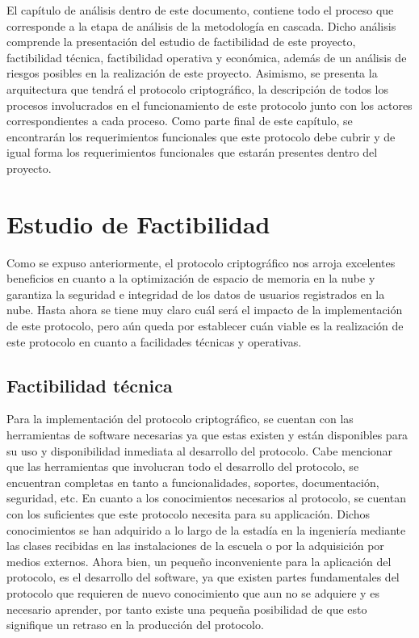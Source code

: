 
El capítulo de análisis dentro de este documento, contiene todo el proceso que corresponde a la etapa de análisis de la metodología en cascada. Dicho análisis comprende la presentación del estudio de factibilidad de este proyecto, factibilidad técnica, factibilidad operativa y económica, además de un análisis de riesgos posibles en la realización de este proyecto. Asimismo, se presenta la arquitectura que tendrá el protocolo criptográfico, la descripción de todos los procesos involucrados en el funcionamiento de este protocolo junto con los actores correspondientes a cada proceso. Como parte final de este capítulo, se encontrarán los requerimientos funcionales que este protocolo debe cubrir y de igual forma los requerimientos funcionales que estarán presentes dentro del proyecto. 






\section{Estudio de Factibilidad}

Como se expuso anteriormente, el protocolo criptográfico nos arroja excelentes beneficios en cuanto a la optimización de espacio de memoria en la nube y garantiza la seguridad e integridad de los datos de usuarios registrados en la nube. Hasta ahora se tiene muy claro cuál será el impacto de la implementación de este protocolo, pero aún queda por establecer cuán viable es la realización de este protocolo en cuanto a facilidades técnicas y operativas.


\subsection{Factibilidad técnica}

Para la implementación del protocolo criptográfico, se cuentan con las herramientas de software necesarias ya que estas existen y están disponibles para su uso y disponibilidad inmediata al desarrollo del protocolo. Cabe mencionar que las herramientas que involucran todo el desarrollo del protocolo, se encuentran completas en tanto a funcionalidades, soportes, documentación, seguridad, etc. 
En cuanto a los conocimientos necesarios al protocolo, se cuentan con los suficientes que este protocolo necesita para su applicación. Dichos conocimientos se han adquirido a lo largo de la estadía en la ingeniería mediante las clases recibidas en las instalaciones de la  escuela o por la adquisición por medios externos. Ahora bien, un pequeño inconveniente para la aplicación del protocolo, es el desarrollo del software, ya que existen partes fundamentales del protocolo que requieren de nuevo conocimiento que aun no se adquiere y es necesario aprender, por tanto existe una pequeña posibilidad de que esto signifique un retraso en la producción del protocolo. 

